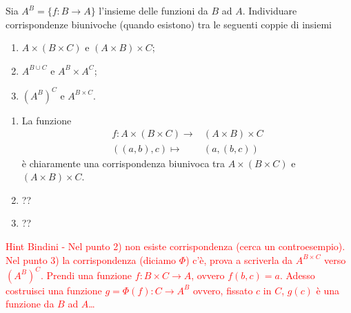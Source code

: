 \begin{es}
  Sia $ A^B = \{f \colon B \to A\} $ l'insieme delle funzioni da $ B $ ad $ A $. Individuare corrispondenze biunivoche (quando esistono) tra le seguenti coppie di insiemi
  \begin{enumerate}
  \item $ A \times (B \times C) $ e $ (A \times B) \times C $;
  \item $ A^{B \cup C} $ e $ A^B \times A^C $;
  \item $ (A^B)^C $ e $ A^{B \times C} $.
  \end{enumerate}
\end{es}
\begin{enumerate}
\item La funzione
  \begin{align*}
    f \colon A \times (B \times C) \to & (A \times B) \times C \\
    ((a, b), c) \mapsto & (a, (b, c))
  \end{align*}
  è chiaramente una corrispondenza biunivoca tra $ A \times (B \times C) $ e $ (A \times B) \times C $.
\item ??
\item ?? \\
\end{enumerate}

\textcolor{red}{Hint Bindini - Nel punto 2) non esiste corrispondenza (cerca un controesempio). Nel punto 3) la corrispondenza (diciamo $ \Phi $) c'è, prova a scriverla da $ A^{B\times C} $ verso $ (A^B)^C $. Prendi una funzione $ f \colon B \times C \to A $, ovvero $ f(b, c) = a $. Adesso costruisci una funzione $ g = \Phi(f) \colon C \to A^B $ ovvero, fissato $ c $ in $ C $, $ g(c) $ è una funzione da $ B $ ad $ A $\ldots}